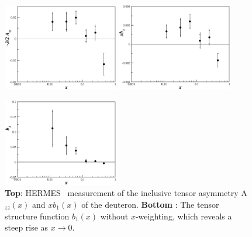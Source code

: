 \label{B1DATASECTION}
%

\begin{figure}
\begin{center}
\includegraphics[angle=0,width=0.45\textwidth]{figs/1.eps}
\hspace{0.5cm}
\includegraphics[angle=0,width=0.45\textwidth]{figs/2.eps}
\vspace{3cm}

\includegraphics[angle=0,width=0.45\textwidth]{figs/3.eps}
\caption{\label{HERMES_AZZ} {\bf Top}: HERMES~\cite{Riedl:2005jq} measurement of the inclusive tensor asymmetry A$_{zz}(x)$ and $xb_1(x)$ of the deuteron. {\bf Bottom} : The tensor structure function $b_1(x)$ without $x$-weighting, which reveals a steep rise as $x\to 0$. 
}
\end{center}\end{figure}

